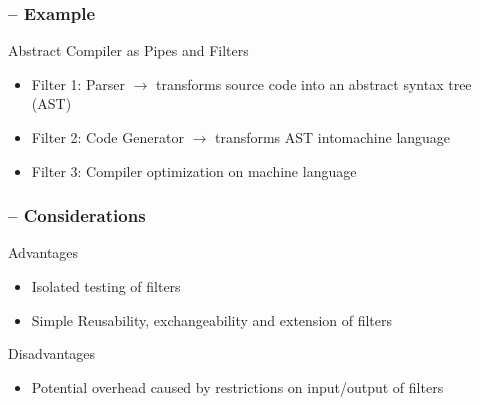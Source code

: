 \begin{frame}
    \frametitle{\insertsubsection{} -- Example}
    \begin{fancycolumns}[widths={45,55}]
        \begin{definition}{Abstract Compiler as Pipes and Filters}
            \begin{itemize}
                \item Filter 1: Parser $\rightarrow$ transforms source code into an abstract syntax tree (AST)
                \item Filter 2: Code Generator $\rightarrow$ transforms AST intomachine language
                \item Filter 3: Compiler optimization on machine language
            \end{itemize}
        \end{definition}
        \nextcolumn
        \begin{figure}
            \centering
        \end{figure}
    \end{fancycolumns}
\end{frame}

\begin{frame}
    \frametitle{\insertsubsection{} -- Considerations}
    \begin{fancycolumns}[widths={45,55}]
        \begin{motivation}{Advantages}
            \begin{itemize}
                \item Isolated testing of filters
                \item Simple Reusability, exchangeability and extension of filters
            \end{itemize}
        \end{motivation}
        \begin{note}{Disadvantages}
            \begin{itemize}
                \item Potential overhead caused by restrictions on input/output of filters
            \end{itemize}
        \end{note}
        \nextcolumn
        \pipesfiltersdefault{}
    \end{fancycolumns}
\end{frame}



